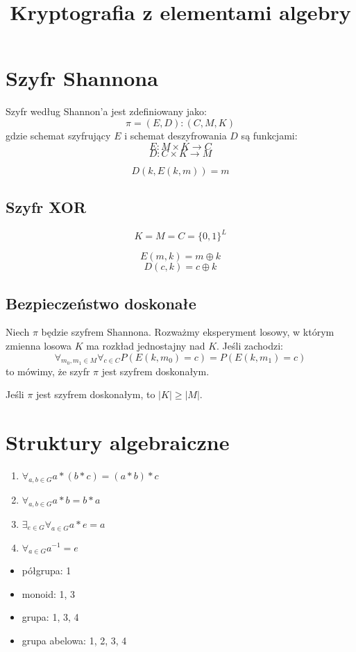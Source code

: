 \documentclass{../notatki}
\title{Kryptografia z elementami algebry}
\begin{document}
\tableofcontents

\section{Szyfr Shannona}

Szyfr według Shannon'a jest zdefiniowany jako:
$$
\pi = (E, D) : (C, M, K)
$$
gdzie schemat szyfrujący $E$ i schemat deszyfrowania $D$ są funkcjami:
$$
E: M \times K \rightarrow C
$$
$$
D: C \times K \rightarrow M
$$

$$
D(k, E(k, m)) = m
$$

\subsection{Szyfr XOR}

$$
K = M = C = \{0, 1\}^L
$$

$$
E(m, k) = m \oplus k
$$
$$
D(c, k) = c \oplus k
$$

\subsection{Bezpieczeństwo doskonałe}

Niech $\pi$ będzie szyfrem Shannona. Rozważmy eksperyment losowy, w którym
zmienna losowa $K$ ma rozkład jednostajny nad $K$. Jeśli zachodzi:
$$
\forall_{m_0, m_1 \in M} \forall_{c \in C} P(E(k, m_0) = c) = P(E(k, m_1) = c)
$$
to mówimy, że szyfr $\pi$ jest szyfrem doskonałym.

Jeśli $\pi$ jest szyfrem doskonałym, to $|K| \ge |M|$.

\section{Struktury algebraiczne}

\begin{enumerate}
  \item $\forall_{a, b \in G} a * (b * c) = (a * b) * c$
  \item $\forall_{a, b \in G} a * b = b * a$
  \item $\exists_{e \in G} \forall_{a \in G} a * e = a$
  \item $\forall_{a \in G} a^{-1} = e$
\end{enumerate}

\begin{itemize}
  \item półgrupa: 1
  \item monoid: 1, 3
  \item grupa: 1, 3, 4
  \item grupa abelowa: 1, 2, 3, 4
\end{itemize}
\end{document}
